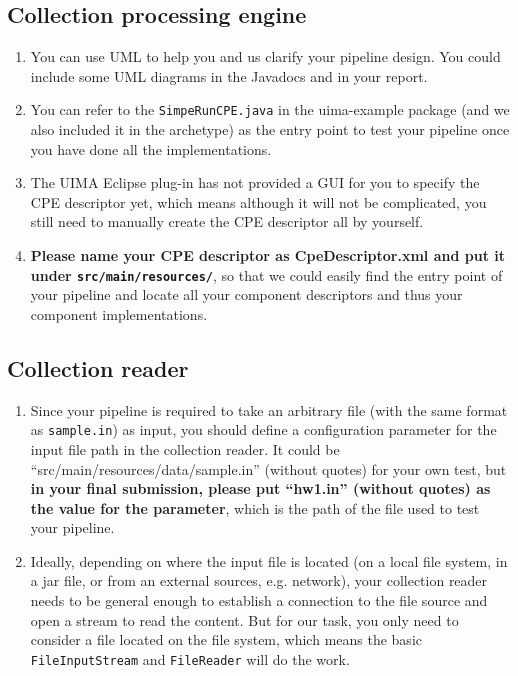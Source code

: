 \subsection{Collection processing engine}

\begin{enumerate}

\item You can use UML to help you and us clarify your pipeline design. You could
include some UML diagrams in the Javadocs and in your report.

\item You can refer to the \texttt{SimpeRunCPE.java} in the uima-example package
(and we also included it in the archetype) as the entry point to test your
pipeline once you have done all the implementations.

\item The UIMA Eclipse plug-in has not provided a GUI for you to specify the CPE
descriptor yet, which means although it will not be complicated, you still need to
manually create the CPE descriptor all by yourself.

\item \textbf{Please name your CPE descriptor as CpeDescriptor.xml and put it
under \texttt{src/main/resources/}}, so that we could easily find the entry point
of your pipeline and locate all your component descriptors and thus your
component implementations.

\end{enumerate}

\subsection{Collection reader}

\begin{enumerate}

\item Since your pipeline is required to take an arbitrary file (with the same
format as \texttt{sample.in}) as input, you should define a configuration
parameter for the input file path in the collection reader. It could be
``src/main/resources/data/sample.in'' (without quotes) for your own test, but
\textbf{in your final submission, please put ``hw1.in'' (without quotes) as the
value for the parameter}, which is the path of the file used to test your
pipeline.

\item Ideally, depending on where the input file is located (on a local file
system, in a jar file, or from an external sources, e.g. network), your
collection reader needs to be general enough to establish a connection to the
file source and open a stream to read the content. But for our task, you only
need to consider a file located on the file system, which means the basic
\texttt{FileInputStream} and \texttt{FileReader} will do the work.

\end{enumerate}

